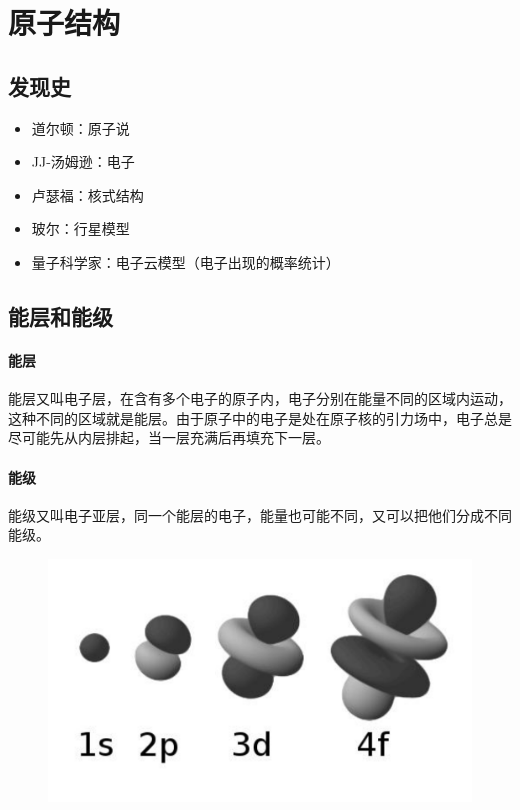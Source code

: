 \documentclass[a4paper]{article}
\begin{document}
	
	\clearpage
	\section{原子结构}
	
	
	\subsection{发现史}
	\begin{itemize}
		\item 道尔顿：原子说
		\item JJ-汤姆逊：电子
		\item 卢瑟福：核式结构
		\item 玻尔：行星模型
		\item 量子科学家：电子云模型（电子出现的概率统计）
	\end{itemize}
	
	
	\subsection{能层和能级}
	\paragraph{能层}
	能层又叫电子层，在含有多个电子的原子内，电子分别在能量不同的区域内运动，这种不同的区域就是能层。由于原子中的电子是处在原子核的引力场中，电子总是尽可能先从内层排起，当一层充满后再填充下一层。
	\paragraph{能级}
	能级又叫电子亚层，同一个能层的电子，能量也可能不同，又可以把他们分成不同能级。
	\begin{figure}[h]
	\centering
	\includegraphics[scale=0.4]{res/Orbital.pdf}
	\end{figure}
	
\end{document}
